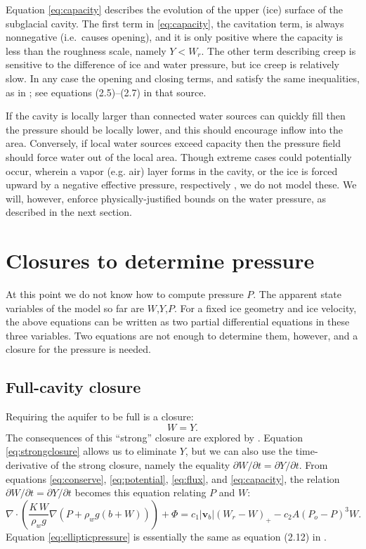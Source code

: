 \documentclass[11pt,final]{amsart}%
\newcommand\bv{\mathbf{v}}
\newcommand{\Div}{\nabla\cdot}
\newcommand{\grad}{\nabla}
\begin{document}
Equation \eqref{eq:capacity} describes the evolution of the upper (ice) surface of the subglacial cavity.  The first term in \eqref{eq:capacity}, the cavitation term, is always nonnegative (i.e.~causes opening), and it is only positive where the capacity is less than the roughness scale, namely $Y<W_r$.  The other term describing creep is sensitive to the difference of ice and water pressure, but ice creep is relatively slow.  In any case the opening and closing terms, and satisfy the same inequalities, as in \cite{Schoofetal2012}; see equations (2.5)--(2.7) in that source.

If the cavity is locally larger than connected water sources can quickly fill then the pressure should be locally lower, and this should encourage inflow into the area.  Conversely, if local water sources exceed capacity then the pressure field should force water out of the local area.  Though extreme cases could potentially occur, wherein a vapor (e.g. air) layer forms in the cavity, or the ice is forced upward by a negative effective pressure, respectively \citep{Schoofetal2012}, we do not model these.  We will, however, enforce physically-justified bounds on the water pressure, as described in the next section.


\section{Closures to determine pressure} \label{sec:closures}

At this point we do not know how to compute pressure $P$.  The apparent state variables of the model so far are $W$,$Y$,$P$.  For a fixed ice geometry and ice velocity, the above equations can be written as two partial differential equations in these three variables.   Two equations are not enough to determine them, however, and a closure for the pressure is needed.

\subsection*{Full-cavity closure}  Requiring the aquifer to be full is a closure:
\begin{equation}
W = Y.\label{eq:strongclosure}
\end{equation}
The consequences of this ``strong'' closure are explored by \cite{Schoofetal2012}.  Equation \eqref{eq:strongclosure} allows us to eliminate $Y$, but we can also use the time-derivative of the strong closure, namely the equality $\partial W/\partial t = \partial Y/\partial t$.  From equations \eqref{eq:conserve}, \eqref{eq:potential}, \eqref{eq:flux}, and \eqref{eq:capacity}, the relation $\partial W/\partial t = \partial Y/\partial t$ becomes this equation relating $P$ and $W$:
\begin{equation}
\Div \left(\frac{K\,W}{\rho_w g} \grad \left(P + \rho_w g (b+W)\right) \right) + \Phi = c_1 |\bv_b| (W_r - W)_+ - c_2 A (P_o - P)^3 W.\label{eq:ellipticpressure}
\end{equation}
Equation \eqref{eq:ellipticpressure} is essentially the same as equation (2.12) in \citep{Schoofetal2012}.
\end{document}
